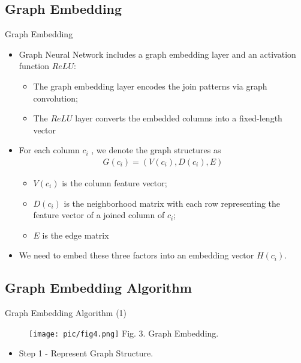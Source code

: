 \documentclass{beamer}
\begin{document}
\subsection{Graph Embedding}
\begin{frame}{Graph Embedding}
    \begin{itemize}
        \item Graph Neural Network includes a graph embedding layer and an activation function $ReLU$:
        \begin{itemize}
            \item The graph embedding layer encodes the join patterns via graph convolution;
            \item The $ReLU$ layer converts the embedded columns into a fixed-length vector
        \end{itemize}
        \item For each column $c_i$ , we denote the graph structures as 
            \begin{align}
                G(c_i ) = (V (c_i ), D(c_i ), E)\nonumber
            \end{align}
            \begin{itemize}
                \item $V (c_i )$ is the column feature vector;
                \item $D(c_i )$ is the neighborhood matrix with each row representing the feature vector of a joined column of $c_i$;
                \item $E$ is the edge matrix
            \end{itemize}
        \item We need to embed these three factors into an embedding vector $H (c_i )$.
    \end{itemize}
\end{frame}

\subsection{Graph Embedding Algorithm}
\begin{frame}{Graph Embedding Algorithm (1)}
    \begin{minipage}{0.4\linewidth}
        \begin{figure}[htpb]
            \centering
            \texttt{[image: pic/fig4.png]}
            \tiny{Fig. 3. Graph Embedding.}
        \end{figure}
    \end{minipage}%
    \begin{minipage}{0.65\linewidth}
        \begin{itemize}
            \item Step 1 - Represent Graph Structure.
        \end{itemize}
    \end{minipage}
\end{frame}
\end{document}
